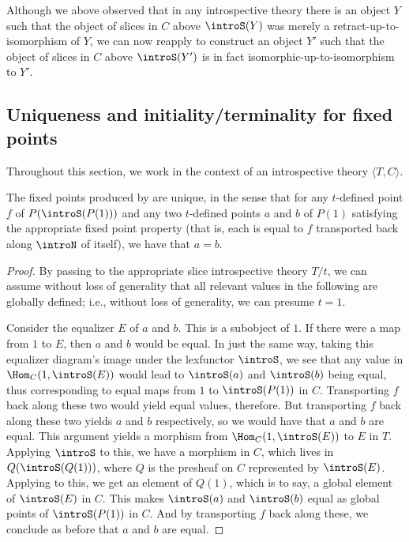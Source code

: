 \begin{observation}
Although we above observed that in any introspective theory there is an object $Y$ such that the object of slices in $C$ above $\introS(Y)$ was merely a retract-up-to-isomorphism of $Y$, we can now reapply  to construct an object $Y'$ such that the object of slices in $C$ above $\introS(Y')$ is in fact isomorphic-up-to-isomorphism to $Y'$. 
\end{observation}

\subsection{Uniqueness and initiality/terminality for fixed points}
Throughout this section, we work in the context of an introspective theory $\langle T, C \rangle$. 

\begin{theorem}\label{UniqueFixedPoints}
The fixed points produced by  are unique, in the sense that for any $t$-defined point $f$ of $P(\introS(P(1)))$ and any two $t$-defined points $a$ and $b$ of $P(1)$ satisfying the appropriate fixed point property (that is, each is equal to $f$ transported back along $\introN$ of itself), we have that $a = b$.
\end{theorem}
\begin{proof}
By passing to the appropriate slice introspective theory $T/t$, we can assume without loss of generality that all relevant values in the following are globally defined; i.e., without loss of generality, we can presume $t = 1$.

Consider the equalizer $E$ of $a$ and $b$. This is a subobject of $1$. If there were a map from $1$ to $E$, then $a$ and $b$ would be equal. In just the same way, taking this equalizer diagram's image under the lexfunctor $\introS$, we see that any value in $\Hom_C(1, \introS(E))$ would lead to $\introS(a)$ and $\introS(b)$ being equal, thus corresponding to equal maps from $1$ to $\introS(P(1))$ in $C$. Transporting $f$ back along these two would yield equal values, therefore. But transporting $f$ back along these two yields $a$ and $b$ respectively, so we would have that $a$ and $b$ are equal. This argument yields a morphism from $\Hom_C(1, \introS(E))$ to $E$ in $T$. Applying $\introS$ to this, we have a morphism in $C$, which lives in $Q(\introS(Q(1)))$, where $Q$ is the presheaf on $C$ represented by $\introS(E)$. Applying  to this, we get an element of $Q(1)$, which is to say, a global element of $\introS(E)$ in $C$. This makes $\introS(a)$ and $\introS(b)$ equal as global points of $\introS(P(1))$ in $C$. And by transporting $f$ back along these, we conclude as before that $a$ and $b$ are equal. 
\end{proof}

